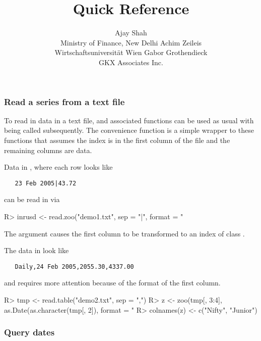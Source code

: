 \documentclass{Z}
\author{Ajay Shah\\Ministry of Finance, New Delhi \And
        Achim Zeileis\\Wirtschaftsuniversit\"at Wien \And
        Gabor Grothendieck\\GKX Associates Inc.}
\title{\pkg{zoo} Quick Reference}
\newcommand{\mysection}[1]{\subsubsection[#1]{\textbf{#1}}}
\begin{document}



\mysection{Read a series from a text file}

To read in data in a text file,  and associated
functions can 
be used as usual with  being called subsequently.
The convenience function  is a simple wrapper to these
functions that assumes the index is in the first column of the file
and the remaining columns are data.

Data in , where each row looks like
\begin{verbatim}
   23 Feb 2005|43.72
\end{verbatim}
can be read in via
\begin{Schunk}
\begin{Sinput}
R> inrusd <- read.zoo("demo1.txt", sep = "|", format = "%d %b %Y")
\end{Sinput}
\end{Schunk}
The  argument causes the first column to be transformed
to an index of class .

The data in  look like
\begin{verbatim}
   Daily,24 Feb 2005,2055.30,4337.00
\end{verbatim}
and requires more attention because of the format of
the first column.
\begin{Schunk}
\begin{Sinput}
R> tmp <- read.table("demo2.txt", sep = ",")
R> z <- zoo(tmp[, 3:4], as.Date(as.character(tmp[, 2]), format = "%d %b %Y"))
R> colnames(z) <- c("Nifty", "Junior")
\end{Sinput}
\end{Schunk}

\mysection{Query dates}
\end{document}
